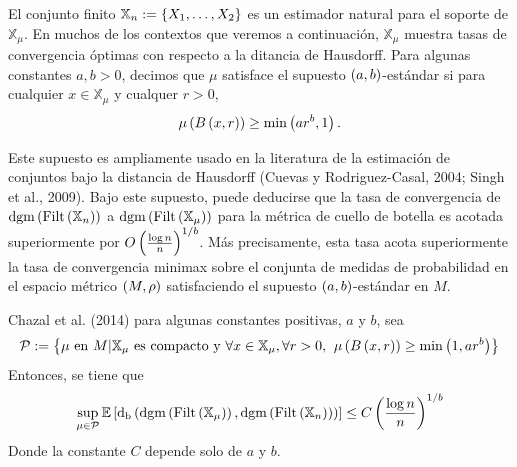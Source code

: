 El conjunto finito $\mathbb{X}_{n}:=\left\{X_{1},\dots,X_{2}\right\}$
es un estimador natural para el soporte de $\mathbb{X}_{\mu}$.
En muchos de los contextos que veremos a continuaci\'on,
$\mathbb{X}_{\mu}$ muestra tasas de convergencia \'optimas
con respecto a la ditancia de Hausdorff.
Para algunas constantes $a,b>0$, decimos que $\mu$ satisface el supuesto
$\left(a,b\right)$-est\'andar si para cualquier $x\in\mathbb{X}_{\mu}$ y cualquer $r>0$,
\begin{equation}
    \mu\left(B\left(x,r\right)\right)\geq\min\left(ar^{b},1\right).
\end{equation}

Este supuesto es ampliamente usado en la literatura de la estimaci\'on de conjuntos
bajo la distancia de Hausdorff
(Cuevas y Rodriguez-Casal, 2004\cite{CuevasRodriguezCasal2004};
Singh et al., 2009\cite{Singh2009}).
Bajo este supuesto, puede deducirse que la tasa de convergencia de
$\mathrm{dgm}\left(\mathrm{Filt}\left(\mathbb{X}_{n}\right)\right)$ a
$\mathrm{dgm}\left(\mathrm{Filt}\left(\mathbb{X}_{\mu}\right)\right)$
para la m\'etrica de cuello de botella es acotada superiormente por
$O\left(\frac{\log n}{n}\right)^{1/b}$. M\'as precisamente, esta tasa
acota superiormente la tasa de convergencia minimax sobre el conjunta de medidas
de probabilidad en el espacio m\'etrico $\left(M, \rho\right)$ satisfaciendo el supuesto
$\left(a,b\right)$-est\'andar en $M$.

\begin{teorema}
    Chazal et al. (2014)\cite{Chazal2014b} para algunas constantes positivas, $a$ y $b$, sea
    \begin{equation*}
        \mathcal{P}:=\left\{\mu \text{ en } M |
        \mathbb{X}_{\mu}\text{ es compacto y }\forall x\in\mathbb{X}_{\mu},\forall r>0,\hspace{4pt}
        \mu\left(B\left(x,r\right)\right)\geq\min\left(1,ar^{b}\right)\right\}
    \end{equation*}
    Entonces, se tiene que
    \begin{equation*}
        \sup_{\mu\in\mathcal{P}}\mathbb{E}\left[
        \mathrm{d}_{\mathrm{b}}\left(\mathrm{dgm}\left(\mathrm{Filt}\left(\mathbb{X}_{\mu}\right)\right),
        \mathrm{dgm}\left(\mathrm{Filt}\left(\mathbb{X}_{n}\right)\right)\right)\right]\leq
        C\left(\frac{\log n}{n}\right)^{1/b}
    \end{equation*}
    Donde la constante $C$ depende solo de $a$ y $b$.
\end{teorema}

